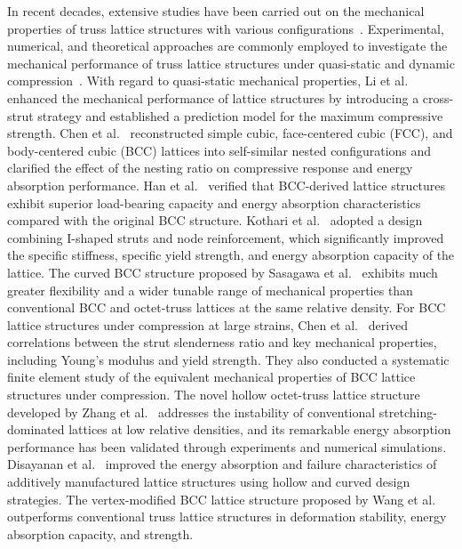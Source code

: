 \documentclass[12pt,a4paper]{article}
\numberwithin{equation}{section}
\begin{document}
	In recent decades, extensive studies have been carried out on the mechanical properties of truss lattice structures with various configurations~\cite{Ref12,Ref13,Ref14,Ref15,Ref16,Ref17,Ref18,Ref19}. Experimental, numerical, and theoretical approaches are commonly employed to investigate the mechanical performance of truss lattice structures under quasi-static and dynamic compression~\cite{Ref20,Ref21,Ref22,Ref23,Ref24,Ref25,Ref26,Ref27,Ref28,Ref29}. With regard to quasi-static mechanical properties, Li et al.~\cite{Ref30} enhanced the mechanical performance of lattice structures by introducing a cross-strut strategy and established a prediction model for the maximum compressive strength. Chen et al.~\cite{Ref31} reconstructed simple cubic, face-centered cubic (FCC), and body-centered cubic (BCC) lattices into self-similar nested configurations and clarified the effect of the nesting ratio on compressive response and energy absorption performance. Han et al.~\cite{Ref32} verified that BCC-derived lattice structures exhibit superior load-bearing capacity and energy absorption characteristics compared with the original BCC structure. Kothari et al.~\cite{Ref33} adopted a design combining I-shaped struts and node reinforcement, which significantly improved the specific stiffness, specific yield strength, and energy absorption capacity of the lattice. The curved BCC structure proposed by Sasagawa et al.~\cite{Ref34} exhibits much greater flexibility and a wider tunable range of mechanical properties than conventional BCC and octet-truss lattices at the same relative density. For BCC lattice structures under compression at large strains, Chen et al.~\cite{Ref35} derived correlations between the strut slenderness ratio and key mechanical properties, including Young's modulus and yield strength. They also conducted a systematic finite element study of the equivalent mechanical properties of BCC lattice structures under compression. The novel hollow octet-truss lattice structure developed by Zhang et al.~\cite{Ref36} addresses the instability of conventional stretching-dominated lattices at low relative densities, and its remarkable energy absorption performance has been validated through experiments and numerical simulations. Disayanan et al.~\cite{Ref37} improved the energy absorption and failure characteristics of additively manufactured lattice structures using hollow and curved design strategies. The vertex-modified BCC lattice structure proposed by Wang et al.~\cite{Ref38} outperforms conventional truss lattice structures in deformation stability, energy absorption capacity, and strength.
	
\end{document}
